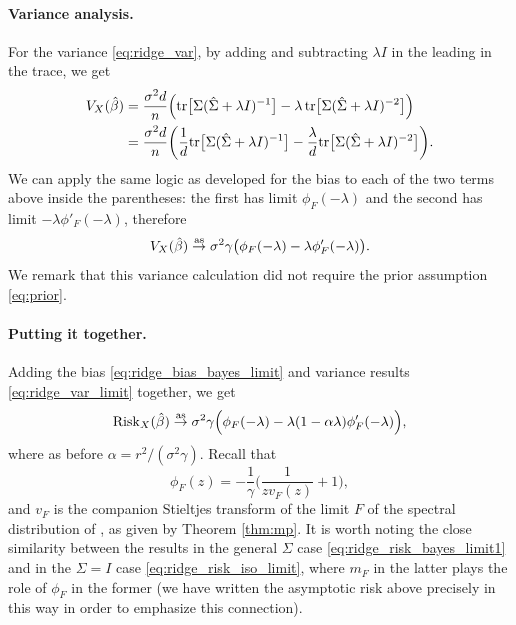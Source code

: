 \documentclass{article}
\begin{document}
\paragraph{Variance analysis.}

For the variance \eqref{eq:ridge_var}, by adding and subtracting $\lambda I$ in
the leading \smash{$\hSigma$} in the trace, we get 
\begin{align*}
V_X(\hat{\beta}) 
&= \frac{\sigma^2 d}{n} \Big( \mathrm{tr} \big[ \Sigma ( \hat\Sigma + \lambda I)^{-1} \big] -
  \lambda \, \mathrm{tr} \big[ \Sigma (\hat\Sigma + \lambda I)^{-2} \big] \Big) \\
&= \frac{\sigma^2 d}{n} \bigg( \frac{1}{d} \mathrm{tr} \big[ \Sigma ( \hat\Sigma + \lambda 
  I)^{-1} \big] -\frac{\lambda}{d} \mathrm{tr} \big[ \Sigma (\hat\Sigma + \lambda I)^{-2} 
  \big] \bigg).
\end{align*}
We can apply the same logic as developed for the bias to each of the two terms
above inside the parentheses: the first has limit $\phi_F(-\lambda)$ and the
second has limit $-\lambda \phi'_F(-\lambda)$, therefore   
\begin{equation}
\label{eq:ridge_var_limit}
V_X(\hat{\beta}) \overset{\mathrm{as}}{\to} \sigma^2 \gamma \big( \phi_F(-\lambda) - \lambda 
\phi'_F(-\lambda) \big).
\end{equation}
We remark that this variance calculation did not require the prior assumption
\eqref{eq:prior}.  

\paragraph{Putting it together.}

Adding the bias \eqref{eq:ridge_bias_bayes_limit} and variance results
\eqref{eq:ridge_var_limit} together, we get
\begin{equation}
\label{eq:ridge_risk_bayes_limit1}
\mathrm{Risk}_X(\hat{\beta}) \overset{\mathrm{as}}{\to} \sigma^2 \gamma \Big( \phi_F(-\lambda) - \lambda (1 -
\alpha \lambda) \phi'_F(-\lambda) \Big),  
\end{equation}
where as before $\alpha = r^2 / (\sigma^2 \gamma)$. Recall that 
 \[
\phi_F(z) = -\frac{1}{\gamma} \bigg( \frac{1}{z v_F(z)} + 1 \bigg),
\]
and $v_F$ is the companion Stieltjes transform of the limit $F$ of the spectral
distribution of \smash{$\hSigma$}, as given by Theorem \ref{thm:mp}. It is worth
noting the close similarity between the results in the general $\Sigma$ case
\eqref{eq:ridge_risk_bayes_limit1} and in the $\Sigma = I$ case
\eqref{eq:ridge_risk_iso_limit}, where $m_F$ in the latter plays the role of 
$\phi_F$ in the former (we have written the asymptotic risk above precisely in
this way in order to emphasize this connection). 
\end{document}
